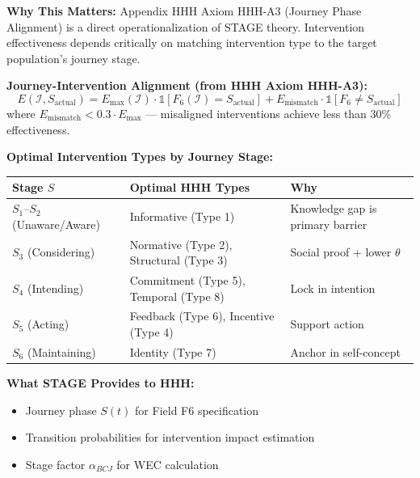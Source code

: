 \begin{tcolorbox}[colback=orange!5!white, colframe=orange!75!black,
    title=\textbf{Integration: STAGE $\leftrightarrow$ HHH (Intervention Toolkit)}]

\textbf{Why This Matters:}
Appendix HHH Axiom HHH-A3 (Journey Phase Alignment) is a direct operationalization
of STAGE theory. Intervention effectiveness depends critically on matching
intervention type to the target population's journey stage.

\textbf{Journey-Intervention Alignment (from HHH Axiom HHH-A3):}
\begin{equation}
E(\mathcal{I}, S_{\text{actual}}) = E_{\max}(\mathcal{I}) \cdot \mathbb{1}[F_6(\mathcal{I}) = S_{\text{actual}}] + E_{\text{mismatch}} \cdot \mathbb{1}[F_6 \neq S_{\text{actual}}]
\end{equation}
where $E_{\text{mismatch}} < 0.3 \cdot E_{\max}$ --- misaligned interventions achieve less than 30\% effectiveness.

\textbf{Optimal Intervention Types by Journey Stage:}
\begin{center}
\renewcommand{\arraystretch}{1.2}
\begin{tabular}{@{}lll@{}}
\toprule
\textbf{Stage $S$} & \textbf{Optimal HHH Types} & \textbf{Why} \\
\midrule
$S_1$--$S_2$ (Unaware/Aware) & Informative (Type 1) & Knowledge gap is primary barrier \\
$S_3$ (Considering) & Normative (Type 2), Structural (Type 3) & Social proof + lower $\theta$ \\
$S_4$ (Intending) & Commitment (Type 5), Temporal (Type 8) & Lock in intention \\
$S_5$ (Acting) & Feedback (Type 6), Incentive (Type 4) & Support action \\
$S_6$ (Maintaining) & Identity (Type 7) & Anchor in self-concept \\
\bottomrule
\end{tabular}
\end{center}

\textbf{What STAGE Provides to HHH:}
\begin{itemize}[nosep]
\item Journey phase $S(t)$ for Field F6 specification
\item Transition probabilities for intervention impact estimation
\item Stage factor $\alpha_{BCJ}$ for WEC calculation
\end{itemize}


\end{tcolorbox}
